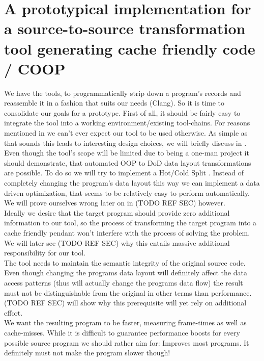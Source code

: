 \chapter{A prototypical implementation for a source-to-source transformation tool generating cache friendly code / COOP}\label{prototype}
We have the tools, to programmatically strip down a program's records and reassemble it in a fashion that suits our needs (Clang). So it is time to consolidate our goals for a prototype. First of all, it should be fairly easy to integrate the tool into a working environment/existing tool-chains. For reasons mentioned in  we can't ever expect our tool to be used otherwise. As simple as that sounds this leads to interesting design choices, we will briefly discuss in .\\
Even though the tool's scope will be limited due to being a one-man project it should demonstrate, that automated OOP to DoD data layout transformations are possible. To do so we will try to implement a Hot/Cold Split . Instead of completely changing the program's data layout this way we can implement a data driven optimization, that seems to be relatively easy to perform automatically. We will prove ourselves wrong later on in (TODO REF SEC) however.\\
Ideally we desire that the target program should provide zero additional information to our tool, so the process of transforming the target program into a cache friendly pendant won't interfere with the process of solving the problem. We will later see (TODO REF SEC) why this entails massive additional responsibility for our tool.\\
The tool needs to maintain the semantic integrity of the original source code. Even though changing the programs data layout will definitely affect the data access patterns (thus will actually change the programs data flow) the result must not be distinguishable from the original in other terms than performance. (TODO REF SEC) will show why this prerequisite will yet rely on additional effort.\\
We want the resulting program to be faster, measuring frame-times as well as cache-misses. While it is difficult to guarantee performance boosts for every possible source program we should rather aim for: Improves most programs. It definitely must not make the program slower though! 
\newpage
